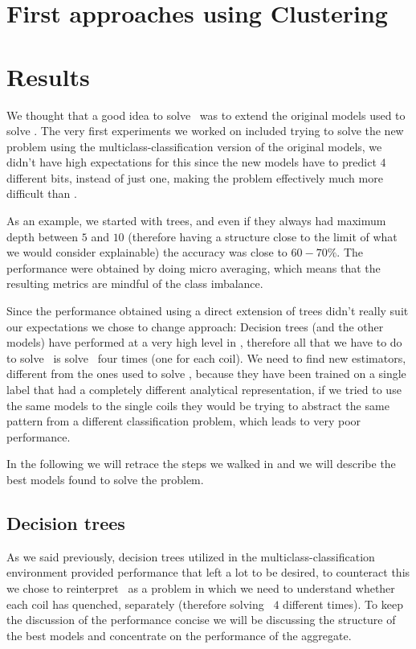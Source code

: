 \section{First approaches using Clustering}

\section{Results}
We thought that a good idea to solve \qlp\ was to extend the original models used to solve \qrp. The
very first experiments we worked on included trying to solve the new problem using the
multiclass-classification version of the original models, we didn't have high expectations for this
since the new models have to predict $4$ different bits, instead of just one, making the problem
effectively much more difficult than \qrp.

As an example, we started with trees, and even if they always had maximum depth between $5$ and $10$
(therefore having a structure close to the limit of what we would consider explainable) the accuracy
was close to $60 - 70\%$. The performance were obtained by doing micro averaging, which means that
the resulting metrics are mindful of the class imbalance.

Since the performance obtained using a direct extension of trees didn't really suit our expectations
we chose to change approach: Decision trees (and the other models) have performed at a very high
level in \qrp, therefore all that we have to do to solve \qlp\ is solve \qrp\ four times (one for
each coil). We need to find new estimators, different from the ones used to solve \qrp, because they
have been trained on a single label that had a completely different analytical representation, if we
tried to use the same models to the single coils they would be trying to abstract the same pattern
from a different classification problem, which leads to very poor performance.

In the following we will retrace the steps we walked in  and we will describe the best
models found to solve the problem.

\subsection{Decision trees}
As we said previously, decision trees utilized in the multiclass-classification environment provided
performance that left a lot to be desired, to counteract this we chose to reinterpret \qlp\ as a
problem in which we need to understand whether each coil has quenched, separately (therefore
solving \qrp\ $4$ different times). To keep the discussion of the performance concise we will be
discussing the structure of the best models and concentrate on the performance of the aggregate.

